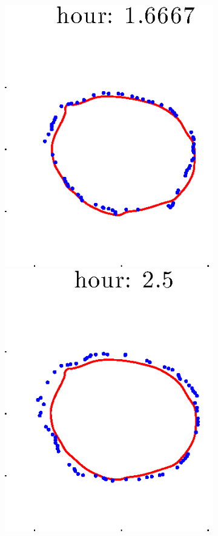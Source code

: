 \documentclass[12pt]{article}
\begin{document}
\begin{figure}[h!]
\begin{subfigure}[b]{.3\textwidth}
		\includegraphics[height=.15\textheight]{Pos10exp2/secondhalf/first3.eps}
		\includegraphics[height=.15\textheight]{Pos10exp2/secondhalf/first4.eps}

\end{subfigure}
\end{figure}
\end{document}
